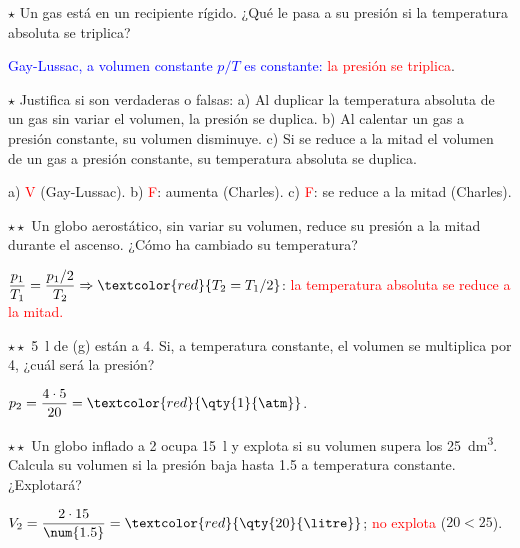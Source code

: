 \begin{exercise}
    \(\star\) Un gas está en un recipiente rígido. ¿Qué le pasa a su presión si la temperatura absoluta se triplica?
    \begin{solu}
        \textcolor{blue}{Gay-Lussac, a volumen constante \(p/T\) es constante:} \textcolor{red}{la presión se triplica}.
    \end{solu}
\end{exercise}

\begin{exercise}
    \(\star\) Justifica si son verdaderas o falsas: a) Al duplicar la temperatura absoluta de un gas sin variar el volumen, la
    presión se duplica. b) Al calentar un gas a presión constante, su volumen disminuye. c) Si se reduce a la mitad el volumen
    de un gas a presión constante, su temperatura absoluta se duplica.
    \begin{solu}
        a) \textcolor{red}{V} (Gay-Lussac). b) \textcolor{red}{F}: aumenta (Charles). c) \textcolor{red}{F}: se reduce a la mitad (Charles).
    \end{solu}
\end{exercise}

\begin{exercise}
    \(\star\star\) Un globo aerostático, sin variar su volumen, reduce su presión a la mitad durante el ascenso. ¿Cómo ha
    cambiado su temperatura?
    \begin{solu}
        \(\dfrac{p_1}{T_1} = \dfrac{p_1/2}{T_2} \Rightarrow \textcolor{red}{T_2 = T_1/2}\): \textcolor{red}{la temperatura absoluta se reduce a la mitad.}
    \end{solu}
\end{exercise}

\begin{exercise}
    \(\star\star\) \qty{5}{\litre} de (g) están a \qty{4}{\atm}. Si, a temperatura constante, el volumen se multiplica por 4,
    ¿cuál será la presión?
    \begin{solu}
        \(p_2 = \dfrac{4 \cdot 5}{20} = \textcolor{red}{\qty{1}{\atm}}\).
    \end{solu}
\end{exercise}

\begin{exercise}
    \(\star\star\) Un globo inflado a \qty{2}{\atm} ocupa \qty{15}{\litre} y explota si su volumen supera los \qty{25}{\cubic\deci\metre}.
    Calcula su volumen si la presión baja hasta \qty{1.5}{\atm} a temperatura constante. ¿Explotará?
    \begin{solu}
        \(V_2 = \dfrac{2 \cdot 15}{\num{1.5}} = \textcolor{red}{\qty{20}{\litre}}\); \textcolor{red}{no explota} (\(20 < 25\)).
    \end{solu}
\end{exercise}

